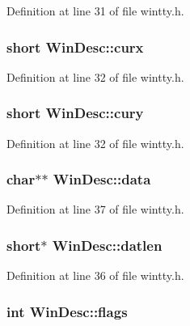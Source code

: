Definition at line 31 of file wintty.\+h.

\hypertarget{structWinDesc_a2653ff0d07637546278df006bd4147a6}{
\subsubsection[{curx}]{\setlength{\rightskip}{0pt plus 5cm}short Win\+Desc\+::curx}}\label{structWinDesc_a2653ff0d07637546278df006bd4147a6}


Definition at line 32 of file wintty.\+h.

\hypertarget{structWinDesc_a6d29483f0286673c97985cb69dab4499}{
\subsubsection[{cury}]{\setlength{\rightskip}{0pt plus 5cm}short Win\+Desc\+::cury}}\label{structWinDesc_a6d29483f0286673c97985cb69dab4499}


Definition at line 32 of file wintty.\+h.

\hypertarget{structWinDesc_ac2373cc97ba4f5d553ee3e6658202c3c}{
\subsubsection[{data}]{\setlength{\rightskip}{0pt plus 5cm}char$\ast$$\ast$ Win\+Desc\+::data}}\label{structWinDesc_ac2373cc97ba4f5d553ee3e6658202c3c}


Definition at line 37 of file wintty.\+h.

\hypertarget{structWinDesc_a16d5076c67644a5736b415e8f613d04e}{
\subsubsection[{datlen}]{\setlength{\rightskip}{0pt plus 5cm}short$\ast$ Win\+Desc\+::datlen}}\label{structWinDesc_a16d5076c67644a5736b415e8f613d04e}


Definition at line 36 of file wintty.\+h.

\hypertarget{structWinDesc_af829a16b38df33481ab03aa9ad5a3f6a}{
\subsubsection[{flags}]{\setlength{\rightskip}{0pt plus 5cm}int Win\+Desc\+::flags}}\label{structWinDesc_af829a16b38df33481ab03aa9ad5a3f6a}


